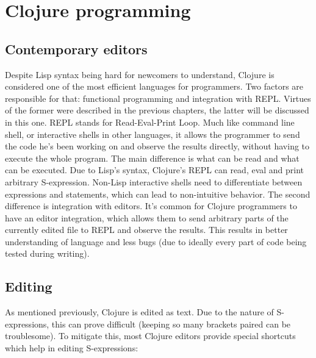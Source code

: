 \documentclass[11pt]{scrartcl}
\begin{document}
\section{Clojure programming}
\subsection{Contemporary editors}
Despite Lisp syntax being hard for newcomers to understand, Clojure is
considered one of the most efficient languages for programmers.
Two factors are responsible for that: functional programming and integration
with REPL.
Virtues of the former were described in the previous chapters, the latter will
be discussed in this one.
REPL stands for Read-Eval-Print Loop.
Much like command line shell, or interactive shells in other languages, it
allows the programmer to send the code he’s been working on and observe the
results directly, without having to execute the whole program.
The main difference is what can be read and what can be executed.
Due to Lisp’s syntax, Clojure’s REPL can read, eval and print arbitrary
S-expression.
Non-Lisp interactive shells need to differentiate between expressions and
statements, which can lead to non-intuitive behavior.
The second difference is integration with editors.
It’s common for Clojure programmers to have an editor integration, which allows
them to send arbitrary parts of the currently edited file to REPL and observe
the results.
This results in better understanding of language and less bugs (due to ideally
every part of code being tested during writing).


\subsection{Editing}
\label{sec:editing}
As mentioned previously, Clojure is edited as text.
Due to the nature of S-expressions, this can prove difficult (keeping so many
brackets paired can be troublesome).
To mitigate this, most Clojure editors provide special shortcuts which help in
editing S-expressions:
\end{document}
